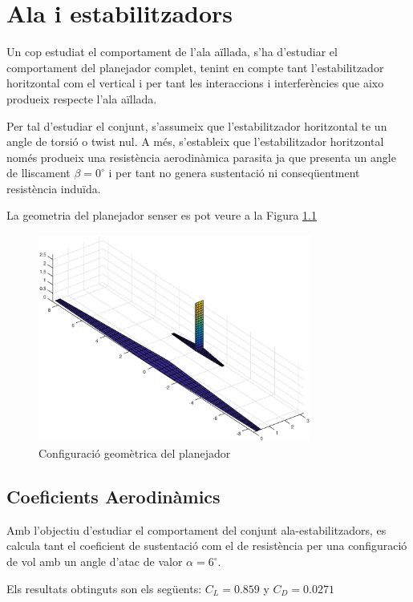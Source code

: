 \chapter{Ala i estabilitzadors}

Un cop estudiat el comportament de l'ala aïllada, s'ha d'estudiar el comportament del planejador complet, tenint en compte tant l'estabilitzador horitzontal com el vertical i per tant les interaccions i interferències que aixo produeix respecte l'ala aïllada. 

Per tal d'estudiar el conjunt, s'assumeix que l'estabilitzador horitzontal te un angle de torsió o twist nul. A més, s'estableix que l'estabilitzador horitzontal només produeix una resistència aerodinàmica parasita ja que presenta un angle de lliscament $\beta=0^{\circ}$ i per tant no genera sustentació ni conseqüentment resistència induïda. 

La geometria del planejador senser es pot veure a la Figura \ref{glider}

 \begin{figure}[H]
 	\centering
 	\includegraphics[width=0.8\textwidth]{./plots/glider}
 	\caption{Configuració geomètrica del planejador}
 	\label{glider}
 \end{figure}

\section{Coeficients Aerodinàmics}

Amb l'objectiu d'estudiar el comportament del conjunt ala-estabilitzadors, es calcula tant el coeficient de sustentació com el de resistència per una configuració de vol amb un angle d'atac de valor $\alpha=6^{\circ}$. 

Els resultats obtinguts son els següents: $C_{L} = 0.859 $ y $C_{D} = 0.0271 $

